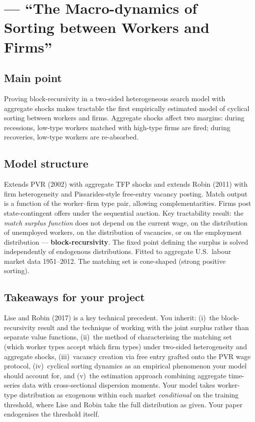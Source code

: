 \documentclass[12pt]{article}
\begin{document}
\section{\citet{lise2017} --- ``The Macro-dynamics of Sorting between Workers and Firms''}

\subsection*{Main point}

Proving block-recursivity in a two-sided heterogeneous search model with aggregate shocks makes tractable the first empirically estimated model of cyclical sorting between workers and firms. Aggregate shocks affect two margins: during recessions, low-type workers matched with high-type firms are fired; during recoveries, low-type workers are re-absorbed.

\subsection*{Model structure}

Extends PVR (2002) with aggregate TFP shocks and extends Robin (2011) with firm heterogeneity and Pissarides-style free-entry vacancy posting. Match output is a function of the worker--firm type pair, allowing complementarities. Firms post state-contingent offers under the sequential auction. Key tractability result: the \emph{match surplus function} does not depend on the current wage, on the distribution of unemployed workers, on the distribution of vacancies, or on the employment distribution --- \textbf{block-recursivity}. The fixed point defining the surplus is solved independently of endogenous distributions. Fitted to aggregate U.S.\ labour market data 1951--2012. The matching set is cone-shaped (strong positive sorting).

\subsection*{Takeaways for your project}

Lise and Robin (2017) is a key technical precedent. You inherit: (i)~the block-recursivity result and the technique of working with the joint surplus rather than separate value functions, (ii)~the method of characterising the matching set (which worker types accept which firm types) under two-sided heterogeneity and aggregate shocks, (iii)~vacancy creation via free entry grafted onto the PVR wage protocol, (iv)~cyclical sorting dynamics as an empirical phenomenon your model should account for, and (v)~the estimation approach combining aggregate time-series data with cross-sectional dispersion moments. Your model takes worker-type distribution as exogenous within each market \emph{conditional} on the training threshold, where Lise and Robin take the full distribution as given. Your paper endogenises the threshold itself.
\end{document}
